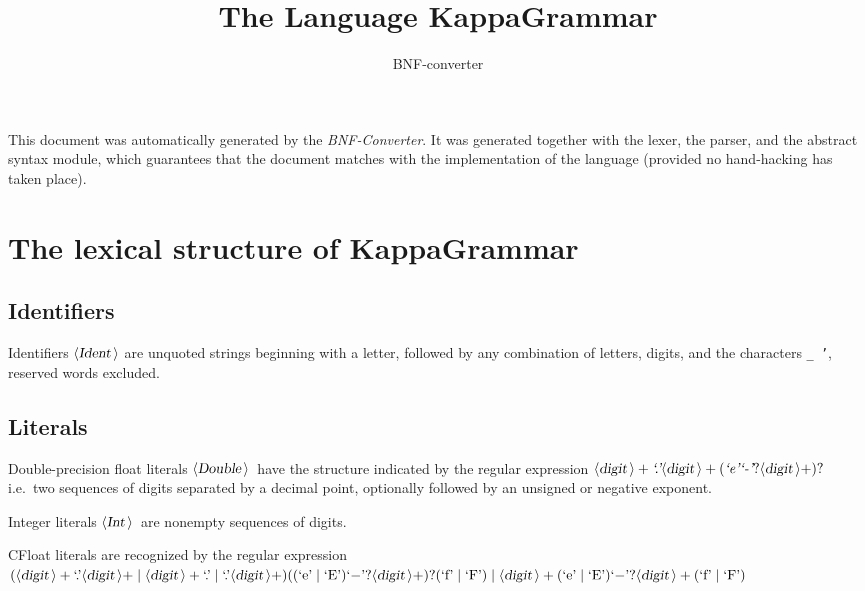 \documentclass[a4paper,11pt]{article}
\author{BNF-converter}
\title{The Language KappaGrammar}
\begin{document}
\maketitle

\newcommand{\emptyP}{\mbox{$\epsilon$}}
\newcommand{\terminal}[1]{\mbox{{\texttt {#1}}}}
\newcommand{\nonterminal}[1]{\mbox{$\langle \mbox{{\sl #1 }} \! \rangle$}}
\newcommand{\arrow}{\mbox{::=}}
\newcommand{\delimit}{\mbox{$|$}}
\newcommand{\reserved}[1]{\mbox{{\texttt {#1}}}}
\newcommand{\literal}[1]{\mbox{{\texttt {#1}}}}
\newcommand{\symb}[1]{\mbox{{\texttt {#1}}}}

This document was automatically generated by the {\em BNF-Converter}. It was generated together with the lexer, the parser, and the abstract syntax module, which guarantees that the document matches with the implementation of the language (provided no hand-hacking has taken place).

\section*{The lexical structure of KappaGrammar}
\subsection*{Identifiers}
Identifiers \nonterminal{Ident} are unquoted strings beginning with a letter,
followed by any combination of letters, digits, and the characters {\tt \_ '},
reserved words excluded.


\subsection*{Literals}
Double-precision float literals \nonterminal{Double}\ have the structure
indicated by the regular expression $\nonterminal{digit}+ \mbox{{\it `.'}} \nonterminal{digit}+ (\mbox{{\it `e'}} \mbox{{\it `-'}}? \nonterminal{digit}+)?$ i.e.\
two sequences of digits separated by a decimal point, optionally
followed by an unsigned or negative exponent.


Integer literals \nonterminal{Int}\ are nonempty sequences of digits.





CFloat literals are recognized by the regular expression
\(({\nonterminal{digit}}+ \mbox{`.'} {\nonterminal{digit}}+ \mid {\nonterminal{digit}}+ \mbox{`.'} \mid \mbox{`.'} {\nonterminal{digit}}+) ((\mbox{`e'} \mid \mbox{`E'}) \mbox{`{$-$}'}? {\nonterminal{digit}}+)? (\mbox{`f'} \mid \mbox{`F'}) \mid {\nonterminal{digit}}+ (\mbox{`e'} \mid \mbox{`E'}) \mbox{`{$-$}'}? {\nonterminal{digit}}+ (\mbox{`f'} \mid \mbox{`F'})\)
\end{document}
